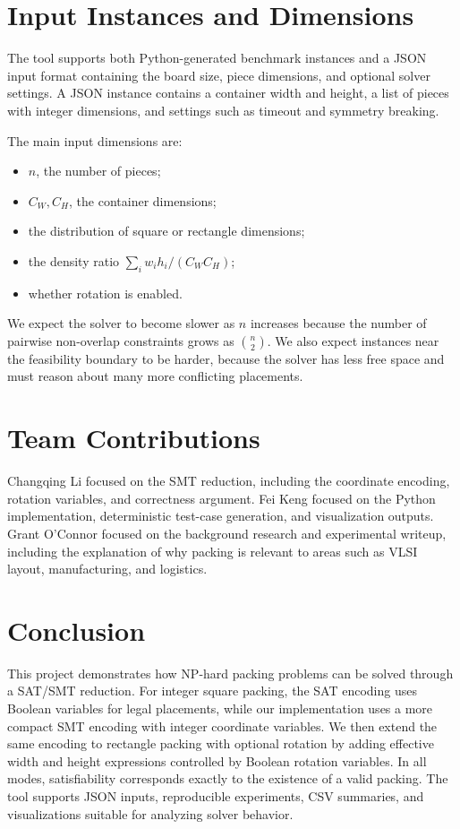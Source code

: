 \documentclass[11pt]{article}
\begin{document}
\section{Input Instances and Dimensions}

The tool supports both Python-generated benchmark instances and a JSON input
format containing the board size, piece dimensions, and optional solver
settings. A JSON instance contains a container width and height, a list of
pieces with integer dimensions, and settings such as timeout and symmetry
breaking.

The main input dimensions are:
\begin{itemize}
    \item \(n\), the number of pieces;
    \item \(C_W,C_H\), the container dimensions;
    \item the distribution of square or rectangle dimensions;
    \item the density ratio \(\sum_i w_i h_i / (C_W C_H)\);
    \item whether rotation is enabled.
\end{itemize}

We expect the solver to become slower as \(n\) increases because the number of
pairwise non-overlap constraints grows as \(\binom{n}{2}\). We also expect
instances near the feasibility boundary to be harder, because the solver has
less free space and must reason about many more conflicting placements.

\section{Team Contributions}

Changqing Li focused on the SMT reduction, including the coordinate encoding,
rotation variables, and correctness argument. Fei Keng focused on the Python
implementation, deterministic test-case generation, and visualization outputs.
Grant O'Connor focused on the background research and experimental writeup,
including the explanation of why packing is relevant to areas such as VLSI
layout, manufacturing, and logistics.

\section{Conclusion}

This project demonstrates how NP-hard packing problems can be solved through a
SAT/SMT reduction. For integer square packing, the SAT encoding uses Boolean
variables for legal placements, while our implementation uses a more compact
SMT encoding with integer coordinate variables. We then extend the same
encoding to rectangle packing with optional rotation by adding effective width
and height expressions controlled by Boolean rotation variables. In all modes,
satisfiability corresponds exactly to the existence of a valid packing. The
tool supports JSON inputs, reproducible experiments, CSV summaries, and
visualizations suitable for analyzing solver behavior.



\end{document}
